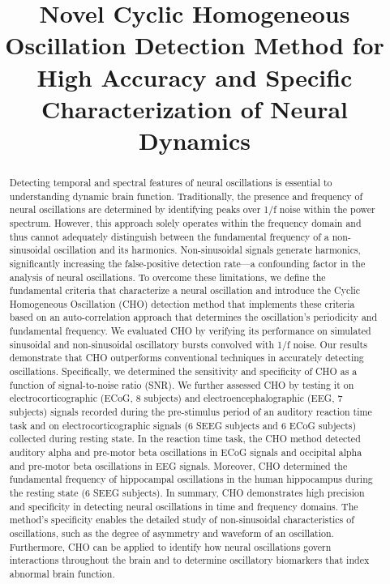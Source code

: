 \documentclass[11pt]{article}
\title{Novel Cyclic Homogeneous Oscillation Detection Method for High Accuracy and Specific Characterization of Neural Dynamics}
\author{}
\date{}
\begin{document}
\maketitle

\begin{abstract}
Detecting temporal and spectral features of neural oscillations is essential to understanding dynamic brain function. Traditionally, the presence and frequency of neural oscillations are determined by identifying peaks over 1/f noise within the power spectrum. However, this approach solely operates within the frequency domain and thus cannot adequately distinguish between the fundamental frequency of a non-sinusoidal oscillation and its harmonics. Non-sinusoidal signals generate harmonics, significantly increasing the false-positive detection rate---a confounding factor in the analysis of neural oscillations. To overcome these limitations, we define the fundamental criteria that characterize a neural oscillation and introduce the Cyclic Homogeneous Oscillation (CHO) detection method that implements these criteria based on an auto-correlation approach that determines the oscillation's periodicity and fundamental frequency. We evaluated CHO by verifying its performance on simulated sinusoidal and non-sinusoidal oscillatory bursts convolved with 1/f noise. Our results demonstrate that CHO outperforms conventional techniques in accurately detecting oscillations. Specifically, we determined the sensitivity and specificity of CHO as a function of signal-to-noise ratio (SNR). We further assessed CHO by testing it on electrocorticographic (ECoG, 8 subjects) and electroencephalographic (EEG, 7 subjects) signals recorded during the pre-stimulus period of an auditory reaction time task and on electrocorticographic signals (6 SEEG subjects and 6 ECoG subjects) collected during resting state. In the reaction time task, the CHO method detected auditory alpha and pre-motor beta oscillations in ECoG signals and occipital alpha and pre-motor beta oscillations in EEG signals. Moreover, CHO determined the fundamental frequency of hippocampal oscillations in the human hippocampus during the resting state (6 SEEG subjects). In summary, CHO demonstrates high precision and specificity in detecting neural oscillations in time and frequency domains. The method's specificity enables the detailed study of non-sinusoidal characteristics of oscillations, such as the degree of asymmetry and waveform of an oscillation. Furthermore, CHO can be applied to identify how neural oscillations govern interactions throughout the brain and to determine oscillatory biomarkers that index abnormal brain function.
\end{abstract}
\end{document}
